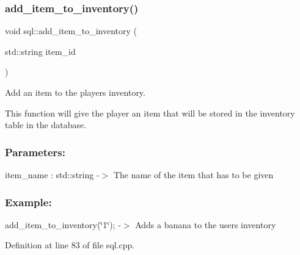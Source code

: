 \subsubsection{\texorpdfstring{add\+\_\+item\+\_\+to\+\_\+inventory()}{add\_item\_to\_inventory()}}
{\footnotesize\ttfamily void sql\+::add\+\_\+item\+\_\+to\+\_\+inventory (\begin{DoxyParamCaption}\item[{std\+::string}]{item\+\_\+id }\end{DoxyParamCaption})}



Add an item to the players inventory. 

This function will give the player an item that will be stored in the inventory table in the database.~\newline


\subsubsection*{Parameters\+: }

item\+\_\+name \+: std\+::string -\/$>$ The name of the item that has to be given

\subsubsection*{Example\+: }

add\+\_\+item\+\_\+to\+\_\+inventory(\char`\"{}1\char`\"{}); -\/$>$ Adds a banana to the users inventory 

Definition at line 83 of file sql.\+cpp.

